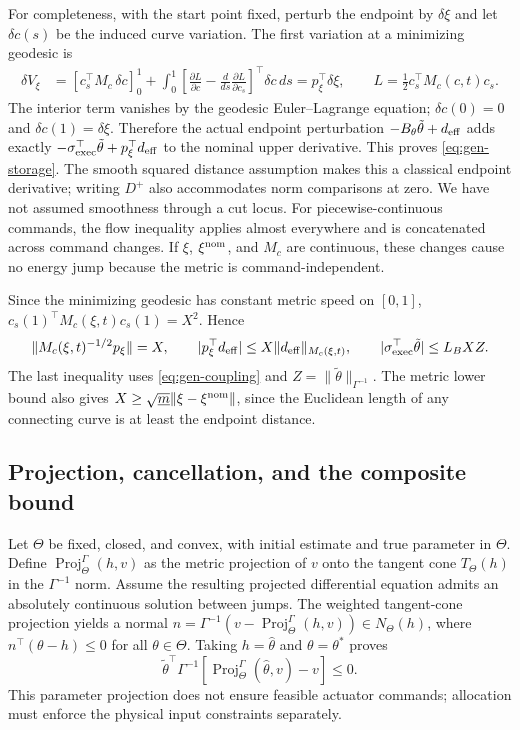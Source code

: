 For completeness, with the start point fixed, perturb the endpoint by
$\delta\xi$ and let $\delta c(s)$ be the induced curve variation.
The first variation at a minimizing geodesic is
\begin{align}
 \delta V_\xi
 &=\left[c_s^\top M_c\,\delta c\right]_0^1+
 \int_0^1\left[\frac{\partial L}{\partial c}
       -\frac{d}{ds}\frac{\partial L}{\partial c_s}\right]^\top
       \delta c\,ds
 =p_\xi^\top\delta\xi,\qquad
 L=\tfrac12c_s^\top M_c(c,t)c_s.
 \label{eq:geodesic-first-variation}
\end{align}
The interior term vanishes by the geodesic Euler--Lagrange equation;
$\delta c(0)=0$ and $\delta c(1)=\delta\xi$. Therefore the actual endpoint
perturbation $-B_\theta\tilde\theta+d_{\rm eff}$ adds exactly
$-\sigma_{\rm exec}^\top\tilde\theta+p_\xi^\top d_{\rm eff}$ to the nominal
upper derivative. This proves \eqref{eq:gen-storage}. The smooth squared
distance assumption makes this a classical endpoint derivative; writing
$D^+$ also accommodates norm comparisons at zero. We have not assumed
smoothness through a cut locus. For piecewise-continuous commands, the
flow inequality applies almost everywhere and is concatenated across
command changes. If $\xi$, $\xi^{\rm nom}$, and $M_c$ are continuous, these
changes cause no energy jump because the metric is command-independent.

Since the minimizing geodesic has constant metric speed on $[0,1]$,
$c_s(1)^\top M_c(\xi,t)c_s(1)=X^2$. Hence
\begin{equation}
 \|M_c(\xi,t)^{-1/2}p_\xi\|=X,\qquad
 |p_\xi^\top d_{\rm eff}|\le X\|d_{\rm eff}\|_{M_c(\xi,t)},\qquad
 |\sigma_{\rm exec}^\top\tilde\theta|\le L_BXZ.
 \label{eq:geodesic-endpoint-bounds}
\end{equation}
The last inequality uses \eqref{eq:gen-coupling} and
$Z=\|\tilde\theta\|_{\Gamma^{-1}}$. The metric lower bound also gives
$X\ge\sqrt{\underline m}\|\xi-\xi^{\rm nom}\|$, since the Euclidean length of any
connecting curve is at least the endpoint distance.

\subsection{Projection, cancellation, and the composite bound}
\label{app:gen-proof}
Let $\Theta$ be fixed, closed, and convex, with initial estimate and true
parameter in $\Theta$. Define $\operatorname{Proj}^{\Gamma}_\Theta(h,v)$
as the metric projection of $v$ onto the tangent cone $T_\Theta(h)$ in
the $\Gamma^{-1}$ norm. Assume the resulting projected differential
equation admits an absolutely continuous solution between jumps.
The weighted tangent-cone projection yields a normal
$n=\Gamma^{-1}(v-\operatorname{Proj}^{\Gamma}_\Theta(h,v))\in N_\Theta(h)$,
where $n^\top(\theta-h)\le0$ for all $\theta\in\Theta$. Taking
$h=\hat\theta$ and $\theta=\theta^*$ proves
\begin{equation}
 \tilde\theta^\top\Gamma^{-1}
 [\operatorname{Proj}^{\Gamma}_\Theta(\hat\theta,v)-v]\le0.
 \label{eq:gen-projection}
\end{equation}
This parameter projection does not ensure feasible actuator commands;
allocation must enforce the physical input constraints separately.

